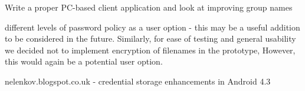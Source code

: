 Write a proper PC-based client application and look at improving group names

different levels of password policy as a user option - this may be a useful addition to be considered in the future.   Similarly, for ease of testing and general usability we decided not to implement encryption of filenames in the prototype,  However, this would again be a potential user option.


nelenkov.blogspot.co.uk - credential storage enhancements in Android 4.3












